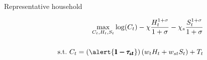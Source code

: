 \documentclass[11pt,aspectratio=169]{beamer}
\begin{document}
\begin{frame}{Representative household}
\hypertarget{backhh}{}
\vspace{2mm}
\begin{minipage}[t!]{1\textwidth}
	\begin{align*}
		\max_{C_t, H_{t}, S_{t}} \log(C_t)-\chi\frac{H_{t}^{1+\sigma}}{1+\sigma}-\chi_s\frac{S_{t}^{1+\sigma}}{1+\sigma}
		\\
		\vspace{4mm}
		\\
		\text{s.t.}\ C_t=(\alert{\pmb{1-\tau_{\iota t}}})\left(w_{t}H_{t}+w_{st}S_t\right)+T_t%
	\end{align*}
\end{minipage}


\end{frame}
\end{document}
